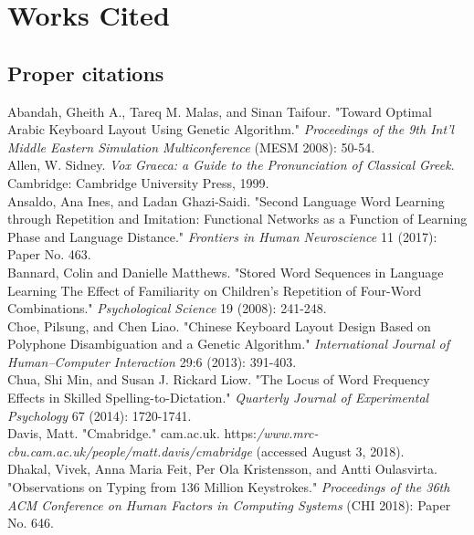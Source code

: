\documentclass[11pt]{article}
\begin{document}
\section{Works Cited}
\label{sec:orgcdf32a8}

\subsection{Proper citations}
\label{sec:orgbcd4cab}

\begin{hangparas}{.25in}{1}

Abandah, Gheith A., Tareq M. Malas, and Sinan Taifour. "Toward Optimal Arabic Keyboard Layout Using Genetic Algorithm." \textit{Proceedings of the 9th Int’l Middle Eastern Simulation Multiconference} (MESM 2008): 50-54. \\

Allen, W. Sidney. \textit{Vox Graeca: a Guide to the Pronunciation of Classical Greek}. Cambridge: Cambridge University Press, 1999. \\

Ansaldo, Ana Ines, and Ladan Ghazi-Saidi. "Second Language Word Learning through Repetition and Imitation: Functional Networks as a Function of Learning Phase and Language Distance." \textit{Frontiers in Human Neuroscience} 11 (2017): Paper No. 463. \\

Bannard, Colin and Danielle Matthews. "Stored Word Sequences in Language Learning The Effect of Familiarity on Children's Repetition of Four-Word Combinations." \textit{Psychological Science} 19 (2008): 241-248. \\

Choe, Pilsung, and Chen Liao. "Chinese Keyboard Layout Design Based on Polyphone Disambiguation and a Genetic Algorithm." \textit{International Journal of Human–Computer Interaction} 29:6 (2013): 391-403. \\

Chua, Shi Min, and Susan J. Rickard Liow. "The Locus of Word Frequency Effects in Skilled Spelling-to-Dictation." \textit{Quarterly Journal of Experimental Psychology} 67 (2014): 1720-1741. \\

Davis, Matt. "Cmabridge." cam.ac.uk. https:\textit{/www.mrc-cbu.cam.ac.uk/people/matt.davis/cmabridge} (accessed August 3, 2018). \\

Dhakal, Vivek, Anna Maria Feit, Per Ola Kristensson, and Antti Oulasvirta. "Observations on Typing from 136 Million Keystrokes." \textit{Proceedings of the 36th ACM Conference on Human Factors in Computing Systems} (CHI 2018): Paper No. 646. \\


\end{hangparas}
\end{document}

